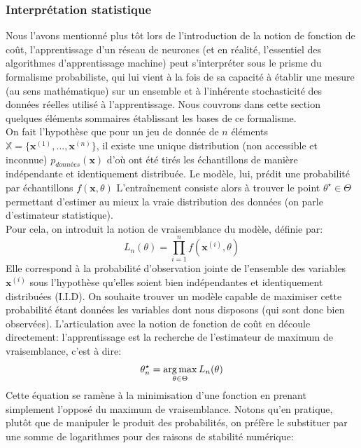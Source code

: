 \subsubsection{Interprétation statistique}
\label{sec:interpretationProbabiliste}
Nous l'avons mentionné plus tôt lors de l'introduction de la notion de fonction de coût, l'apprentissage d'un réseau de neurones (et en réalité, l'essentiel des algorithmes d'apprentissage machine) peut s'interpréter sous le prisme du formalisme probabiliste, qui lui vient à la fois de sa capacité à établir une mesure (au sens mathématique) sur un ensemble et à l'inhérente stochasticité des données réelles utilisé à l'apprentissage. Nous couvrons dans cette section quelques éléments sommaires établissant les bases de ce formalisme. \\
On fait l'hypothèse que pour un jeu de donnée de $n$ éléments $\mathbb{X} = \{\mathbf{x}^{(1)}, ..., \mathbf{x}^{(n)}\}$, il existe une unique distribution (non accessible et inconnue) $p_{données}(\mathbf{x})$ d'où ont été tirés les échantillons de manière indépendante et identiquement distribuée. Le modèle, lui, prédit une probabilité par échantillons $f(\mathbf{x}, \theta)$
L'entraînement consiste alors à trouver le point $\theta^{\star} \in \Theta$ permettant d'estimer au mieux la vraie distribution des données (on parle d'estimateur statistique). \\
Pour cela, on introduit la notion de vraisemblance du modèle, définie par:
\begin{equation}
	\label{eq:maximumVraisemblance}
	L_n(\theta) = \prod_{i=1}^{n}f(\mathbf{x}^{(i)}, \theta)
\end{equation}
Elle correspond à la probabilité d'observation jointe de l'ensemble des variables $\mathbf{x}^{(i)}$ sous l'hypothèse qu'elles soient bien indépendantes et identiquement distribuées (I.I.D).
On souhaite trouver un modèle capable de maximiser cette probabilité étant données les variables dont nous disposons (qui sont donc bien observées).
L'articulation avec la notion de fonction de coût en découle directement: l'apprentissage est la recherche de l'estimateur de maximum de vraisemblance, c'est à dire:
\begin{equation}
	\theta^{\star}_n = \operatorname*{arg\,max}_{\theta \in \Theta} L_n(\theta)
\end{equation}
Cette équation se ramène à la minimisation d'une fonction en prenant simplement l'opposé du maximum de vraisemblance. Notons qu'en pratique, plutôt que de manipuler le produit des probabilités, on préfère le substituer par une somme de logarithmes pour des raisons de stabilité numérique:
